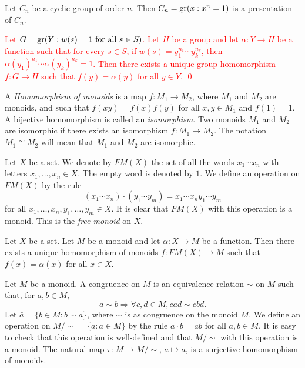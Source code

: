 \begin{example}
    Let $C_n$ be a cyclic group of order $n$. 
    Then $C_n=\operatorname{gr}(x: x^n=1)$ is a presentation of $C_n$.
\end{example}

\textcolor{red}{
\begin{proposition}\label{prop:presentation}
Let $G=\operatorname{gr}(Y: w(s)=1\mbox{ for all }s\in S)$. Let $H$ be a group and let $\alpha\colon Y\rightarrow H$ be a function such that for every $s\in S$, if $w(s)=y_1^{n_1}\cdots y_k^{n_k}$, then $\alpha(y_1)^{n_1}\cdots \alpha(y_k)^{n_k}=1$. Then there exists a unique group homomorphism $f\colon G\rightarrow H$ such that $f(y)=\alpha(y)$ for all $y\in Y$. \qed
\end{proposition}}

A {\em Homomorphism of monoids} is a map $f\colon M_1\rightarrow M_2$, where $M_1$ and $M_2$ are monoids, and such that $f(xy)=f(x)f(y)$ for all $x,y\in M_1$ and $f(1)=1$. A bijective homomorphism is called an {\em isomorphism}. Two monoids $M_1$ and $M_2$ are isomorphic if there exists an isomorphism $f\colon M_1\rightarrow M_2$. The notation $M_1\cong M_2$ will mean that $M_1$ and $M_2$ are isomorphic. 

Let $X$ be a set. We denote by $FM(X)$ the set of all the words $x_1\cdots x_n$ with letters $x_1,\dots ,x_n\in X$. The empty word is denoted by $1$. We define an operation on $FM(X)$ by the rule
\[ (x_1\cdots x_n)\cdot (y_1\cdots y_m)=x_1\cdots x_ny_1\cdots y_m\]
for all $x_1,\dots ,x_n,y_1,\dots ,y_m\in X$. It is clear that $FM(X)$ with this operation is a monoid. This is the {\em free monoid} on $X$.

\begin{proposition}
Let $X$ be a set. Let $M$ be a monoid and let $\alpha\colon X\rightarrow M$ be a function. Then there exists a unique homomorphism of monoids $f\colon FM(X)\rightarrow M$ such that $f(x)=\alpha(x)$ for all $x\in X$.
\end{proposition}

Let $M$ be a monoid. A congruence on $M$ is an equivalence relation $\sim$ on $M$ such that, for $a,b\in M$,
\[ a\sim b\Rightarrow \forall c,d\in M, cad\sim cbd.\]
Let $\bar a=\{ b\in M : b\sim a\}$, where $\sim$ is as congruence on the monoid $M$. We define an operation on $M/\sim=\{ \bar a : a\in M\}$ by the rule $\bar a\cdot \bar b=\overline{ab}$ for all $a,b\in M$. It is easy to check that this operation is well-defined and that $M/\sim$ with this operation is a monoid. The natural map $\pi\colon M\rightarrow M/\sim$, $a\mapsto \bar a$, is a surjective homomorphism of monoids.

